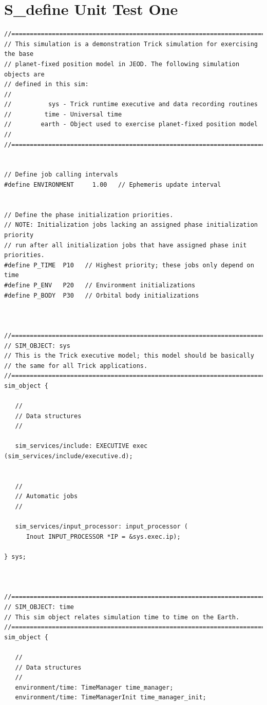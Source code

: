 \documentclass[twoside,11pt,titlepage]{report}
\begin{document}
\chapter{S\_define Unit Test One}\label{ap1:s1}
\begin{verbatim}
//==============================================================================
// This simulation is a demonstration Trick simulation for exercising the base
// planet-fixed position model in JEOD. The following simulation objects are
// defined in this sim:
//
//          sys - Trick runtime executive and data recording routines
//         time - Universal time
//        earth - Object used to exercise planet-fixed position model
//
//==============================================================================


// Define job calling intervals
#define ENVIRONMENT     1.00   // Ephemeris update interval


// Define the phase initialization priorities.
// NOTE: Initialization jobs lacking an assigned phase initialization priority
// run after all initialization jobs that have assigned phase init priorities.
#define P_TIME  P10   // Highest priority; these jobs only depend on time
#define P_ENV   P20   // Environment initializations
#define P_BODY  P30   // Orbital body initializations



//==============================================================================
// SIM_OBJECT: sys
// This is the Trick executive model; this model should be basically
// the same for all Trick applications.
//==============================================================================
sim_object {

   //
   // Data structures
   //

   sim_services/include: EXECUTIVE exec (sim_services/include/executive.d);


   //
   // Automatic jobs
   //

   sim_services/input_processor: input_processor (
      Inout INPUT_PROCESSOR *IP = &sys.exec.ip);

} sys;



//==============================================================================
// SIM_OBJECT: time
// This sim object relates simulation time to time on the Earth.
//==============================================================================
sim_object {

   //
   // Data structures
   //
   environment/time: TimeManager time_manager;
   environment/time: TimeManagerInit time_manager_init;


\end{verbatim}
\end{document}
